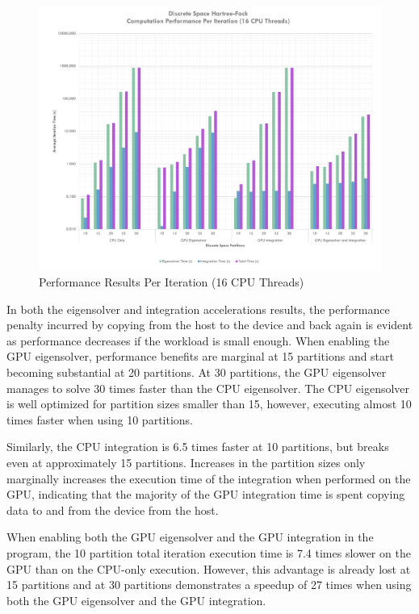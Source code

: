 \documentclass[conference, twoside]{IEEEtran}
\begin{document}
\begin{figure}[ht]
\centering
\includegraphics[width=7in]{figures/sixteen-core-results.pdf}
\caption{Performance Results Per Iteration (16 CPU Threads)}
\label{perf-results-per-iteration-sixteen-core}
\end{figure}

In both the eigensolver and integration accelerations results, the performance penalty incurred by copying from the host to the device and back again is evident as performance decreases if the workload is small enough. When enabling the GPU eigensolver, performance benefits are marginal at 15 partitions and start becoming substantial at 20 partitions. At 30 partitions, the GPU eigensolver manages to solve 30 times faster than the CPU eigensolver. The CPU eigensolver is well optimized for partition sizes smaller than 15, however, executing almost 10 times faster when using 10 partitions.

Similarly, the CPU integration is 6.5 times faster at 10 partitions, but breaks even at approximately 15 partitions. Increases in the partition sizes only marginally increases the execution time of the integration when performed on the GPU, indicating that the majority of the GPU integration time is spent copying data to and from the device from the host.

When enabling both the GPU eigensolver and the GPU integration in the program, the 10 partition total iteration execution time is 7.4 times slower on the GPU than on the CPU-only execution. However, this advantage is already lost at 15 partitions and at 30 partitions demonstrates a speedup of 27 times when using both the GPU eigensolver and the GPU integration.
\end{document}
